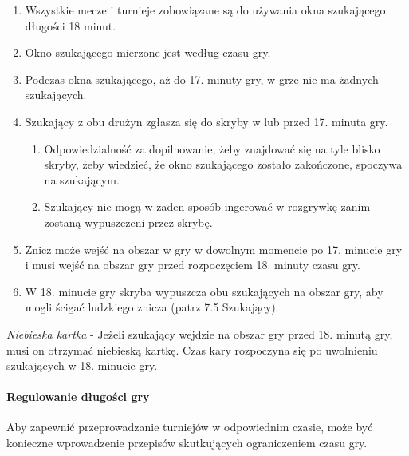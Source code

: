 \documentclass[12pt]{article}
\begin{document}
\begin{enumerate}
\item Wszystkie mecze i turnieje zobowiązane są do używania okna
szukającego długości 18 minut.

\item Okno szukającego mierzone jest według czasu gry.

\item Podczas okna szukającego, aż do 17. minuty gry, w grze nie ma żadnych
szukających.

\item Szukający z obu drużyn zgłasza się do skryby w lub przed 17. minuta
gry.
\begin{enumerate}
\item Odpowiedzialność za dopilnowanie, żeby znajdować się na tyle blisko
skryby, żeby wiedzieć, że okno szukającego zostało zakończone, spoczywa
na szukającym.

\item Szukający nie mogą w żaden sposób ingerować w rozgrywkę zanim
zostaną wypuszczeni przez skrybę.
\end{enumerate}

\item Znicz może wejść na obszar w gry w dowolnym momencie po 17. minucie
gry i musi wejść na obszar gry przed rozpoczęciem 18. minuty czasu gry.

\item W 18. minucie gry skryba wypuszcza obu szukających na obszar gry, aby
mogli ścigać ludzkiego znicza (patrz 7.5 Szukający).
\end{enumerate}

\emph{Niebieska kartka} - Jeżeli szukający wejdzie na obszar gry przed
18. minutą gry, musi on otrzymać niebieską kartkę. Czas kary rozpoczyna
się po uwolnieniu szukających w 18. minucie gry.

\paragraph{Regulowanie długości gry} 
Aby zapewnić
przeprowadzanie turniejów w odpowiednim czasie, może być konieczne
wprowadzenie przepisów skutkujących ograniczeniem czasu gry.
\end{document}
